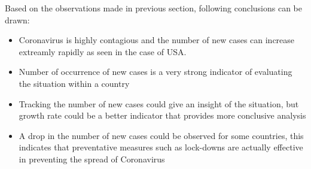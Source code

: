 \documentclass[12pt, twosided]{report}  %
\begin{document}
Based on the observations made in previous section, following conclusions can be drawn:
\begin{itemize}
	\item Coronavirus is highly contagious and the number of new cases can increase extreamly rapidly as seen in the case of USA.
	\item Number of occurrence of new cases is a very strong indicator of evaluating the situation within a country
	\item Tracking the number of new cases could give an insight of the situation, but growth rate could be a better indicator that provides more conclusive analysis
	\item  A drop in the number of new cases could be observed for some countries, this indicates that preventative measures such as lock-downs are actually effective in preventing the spread of Coronavirus  
\end{itemize}  



\end{document}
